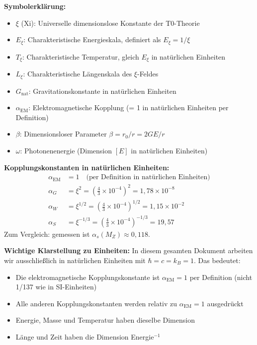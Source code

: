 	\textbf{Symbolerklärung:}
	\begin{itemize}
		\item $\xi$ (Xi): Universelle dimensionslose Konstante der T0-Theorie
		\item $E_\xi$: Charakteristische Energieskala, definiert als $E_\xi = 1/\xi$
		\item $T_\xi$: Charakteristische Temperatur, gleich $E_\xi$ in natürlichen Einheiten
		\item $L_\xi$: Charakteristische Längenskala des $\xi$-Feldes
		\item $G_{\text{nat}}$: Gravitationskonstante in natürlichen Einheiten
		\item $\alpha_{\text{EM}}$: Elektromagnetische Kopplung (= 1 in natürlichen Einheiten per Definition)
		\item $\beta$: Dimensionsloser Parameter $\beta = r_0/r = 2GE/r$
		\item $\omega$: Photonenenergie (Dimension $[E]$ in natürlichen Einheiten)
	\end{itemize}
	
	\textbf{Kopplungskonstanten in natürlichen Einheiten:}
	\begin{align}
		\alpha_{\text{EM}} &= 1 \quad \text{(per Definition in natürlichen Einheiten)} \\
		\alpha_G &= \xi^2 = \left(\frac{4}{3} \times 10^{-4}\right)^2 = 1{,}78 \times 10^{-8} \\
		\alpha_W &= \xi^{1/2} = \left(\frac{4}{3} \times 10^{-4}\right)^{1/2} = 1{,}15 \times 10^{-2} \\
		\alpha_S &= \xi^{-1/3} = \left(\frac{4}{3} \times 10^{-4}\right)^{-1/3} = 19{,}57
	\end{align}
	Zum Vergleich: gemessen ist $\alpha_s(M_Z) \approx 0{,}118$.
	
	\textbf{Wichtige Klarstellung zu Einheiten:}
	In diesem gesamten Dokument arbeiten wir ausschließ{}lich in natürlichen Einheiten mit $\hbar = c = k_B = 1$. Das bedeutet:
	\begin{itemize}
		\item Die elektromagnetische Kopplungskonstante ist $\alpha_{\text{EM}} = 1$ per Definition (nicht 1/137 wie in SI-Einheiten)
		\item Alle anderen Kopplungskonstanten werden relativ zu $\alpha_{\text{EM}} = 1$ ausgedrückt
		\item Energie, Masse und Temperatur haben dieselbe Dimension
		\item Länge und Zeit haben die Dimension Energie$^{-1}$
	\end{itemize}
	
